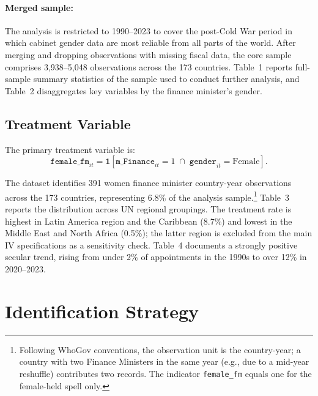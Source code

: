 \documentclass[12pt]{article}
\begin{document}
\paragraph{Merged sample:}
The analysis is restricted to 1990--2023 to cover the post-Cold War period in which cabinet gender data are most reliable from all parts of the world. After merging and dropping observations with missing fiscal data, the core sample comprises 3,938--5,048 observations across the 173 countries. Table~1 reports full-sample summary statistics of the sample used to conduct further analysis, and Table~2 disaggregates key variables by the finance minister's gender.

\subsection{Treatment Variable}

The primary treatment variable is:
\begin{equation}
  \texttt{female\_fm}_{it}
    = \mathbf{1}\!\left[
        \texttt{m\_Finance}_{it} = 1
        \;\cap\;
        \texttt{gender}_{it} = \text{Female}
      \right].
  \label{eq:treatment}
\end{equation}

The dataset identifies 391 women finance minister country-year observations across the 173 countries, representing 6.8\% of the analysis sample.\footnote{Following WhoGov conventions, the observation unit is the country-year; a country with two Finance Ministers in the same year (e.g., due to a mid-year reshuffle) contributes two records. The indicator \texttt{female\_fm} equals one for the female-held spell only.} Table~3 reports the distribution across UN regional groupings. The treatment rate is highest in Latin America region and the Caribbean (8.7\%) and lowest in the Middle East and North Africa (0.5\%); the latter region is excluded from the main IV specifications as a sensitivity check. Table~4 documents a strongly positive secular trend, rising from under 2\% of appointments in the 1990s to over 12\% in 2020--2023.



\section{Identification Strategy}
\label{sec:identification}
\end{document}

